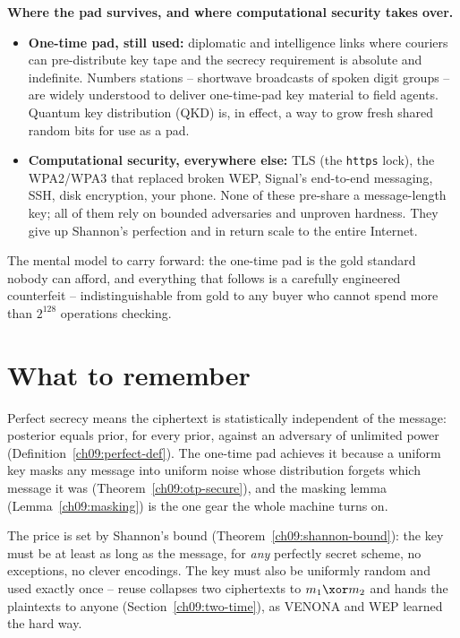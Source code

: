 \begin{applicationbox}
\textbf{Where the pad survives, and where computational security takes over.}
\begin{itemize}
  \item \textbf{One-time pad, still used:} diplomatic and intelligence links where couriers can pre-distribute key tape and the secrecy requirement is absolute and indefinite. Numbers stations -- shortwave broadcasts of spoken digit groups -- are widely understood to deliver one-time-pad key material to field agents. Quantum key distribution (QKD) is, in effect, a way to grow fresh shared random bits for use as a pad.
  \item \textbf{Computational security, everywhere else:} TLS (the \texttt{https} lock), the WPA2/WPA3 that replaced broken WEP, Signal's end-to-end messaging, SSH, disk encryption, your phone. None of these pre-share a message-length key; all of them rely on bounded adversaries and unproven hardness. They give up Shannon's perfection and in return scale to the entire Internet.
\end{itemize}
The mental model to carry forward: the one-time pad is the gold standard nobody can afford, and everything that follows is a carefully engineered counterfeit -- indistinguishable from gold to any buyer who cannot spend more than $2^{128}$ operations checking.
\end{applicationbox}

\section{What to remember}
\label{ch09:summary}

Perfect secrecy means the ciphertext is statistically independent of the message: posterior equals prior, for every prior, against an adversary of unlimited power (Definition~\ref{ch09:perfect-def}). The one-time pad achieves it because a uniform key masks any message into uniform noise whose distribution forgets which message it was (Theorem~\ref{ch09:otp-secure}), and the masking lemma (Lemma~\ref{ch09:masking}) is the one gear the whole machine turns on.

The price is set by Shannon's bound (Theorem~\ref{ch09:shannon-bound}): the key must be at least as long as the message, for \emph{any} perfectly secret scheme, no exceptions, no clever encodings. The key must also be uniformly random and used exactly once -- reuse collapses two ciphertexts to $m_1 \xor m_2$ and hands the plaintexts to anyone (Section~\ref{ch09:two-time}), as VENONA and WEP learned the hard way.

